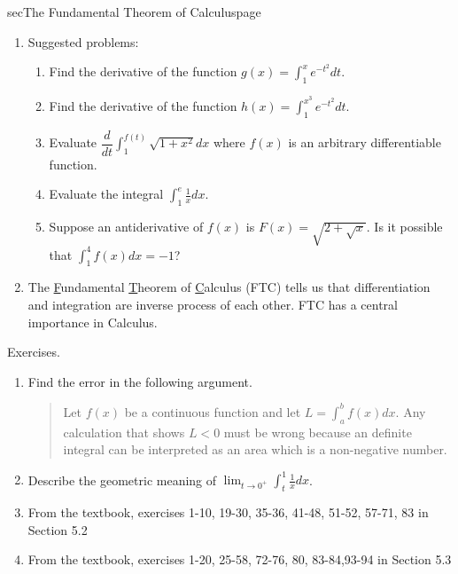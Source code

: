 \documentclass[../main]{subfiles}
\begin{document}
\begin{outline}{sec}{The Fundamental Theorem of Calculus}{page}
\begin{enumerate}
\begin{mdframed}[style=simple]
\[        \]
        where \(F\) is any antiderivative of \(f\), that is, a function \(F\) such that \(F' = f\).
      \end{mdframed}
    \item Suggested problems:
      \begin{enumerate}
        \item Find the derivative of the function \(g(x) = \int_{1}^{x} e^{-t^{2}} dt\).
        \item Find the derivative of the function \(h(x) = \int_{1}^{x^{3}} e^{-t^{2}} dt\).
        \item Evaluate \(\dfrac{d}{dt} \int_{1}^{f(t)} \sqrt{1 + x^{2}} dx\) where \(f(x)\) is an arbitrary differentiable function.
        \item Evaluate the integral \(\int_{1}^{e} \frac{1}{x} dx\).
        \item Suppose an antiderivative of \(f(x)\) is \(F(x) = \sqrt{2 + \sqrt{x}}\). Is it possible that \(\int_{1}^{4} f(x) dx = -1\)?
      \end{enumerate}
    \item {The \underline{\large F}undamental \underline{\large T}heorem of \underline{\large C}alculus (FTC) tells us that differentiation and integration are inverse process of each other. FTC has a central importance in Calculus.}
  \end{enumerate}
\end{outline}





%
%
Exercises.
\begin{enumerate}
\item Find the error in the following argument. 
  \begin{quote}
    Let \(f(x)\) be a continuous function and let \(L = \int_{a}^{b} f(x) dx\). Any calculation that shows \(L < 0\) must be wrong because an definite integral can be interpreted as an area which is a non-negative number.
  \end{quote}
\item Describe the geometric meaning of \(\lim_{t \to 0^{+}} \int_{t}^{1} \frac{1}{x} dx\). 
\item   From the textbook, exercises  1-10, 19-30, 35-36, 41-48, 51-52, 57-71, 83 in Section 5.2%
\item   From the textbook, exercises  1-20, 25-58, 72-76, 80, 83-84,93-94 in Section 5.3
\end{enumerate}
\end{document}
